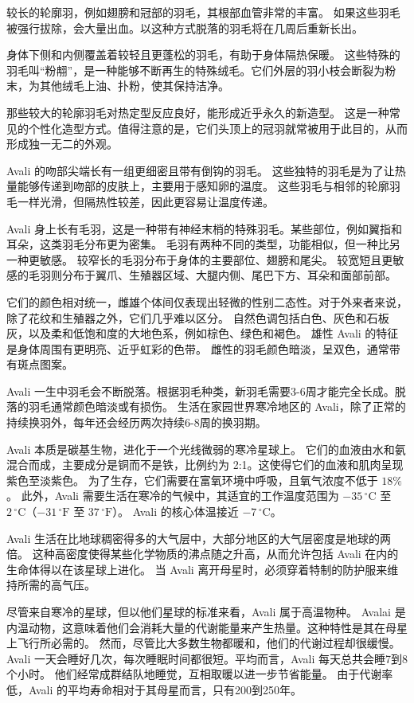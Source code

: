 较长的轮廓羽，例如翅膀和冠部的羽毛，其根部血管非常的丰富。
如果这些羽毛被强行拔除，会大量出血。以这种方式脱落的羽毛将在几周后重新长出。

身体下侧和内侧覆盖着较轻且更蓬松的羽毛，有助于身体隔热保暖。
这些特殊的羽毛叫“粉䎃”，是一种能够不断再生的特殊绒毛。它们外层的羽小枝会断裂为粉末，为其他绒毛上油、扑粉，使其保持洁净。

那些较大的轮廓羽毛对热定型反应良好，能形成近乎永久的新造型。
这是一种常见的个性化造型方式。值得注意的是，它们头顶上的冠羽就常被用于此目的，从而形成独一无二的外观。

Avali 的吻部尖端长有一组更细密且带有倒钩的羽毛。
这些独特的羽毛是为了让热量能够传递到吻部的皮肤上，主要用于感知卵的温度。
这些羽毛与相邻的轮廓羽毛一样光滑，但隔热性较差，因此更容易让温度传递。

Avali 身上长有毛羽，这是一种带有神经末梢的特殊羽毛。某些部位，例如翼指和耳朵，这类羽毛分布更为密集。
毛羽有两种不同的类型，功能相似，但一种比另一种更敏感。
较窄长的毛羽分布于身体的主要部位、翅膀和尾尖。
较宽短且更敏感的毛羽则分布于翼爪、生殖器区域、大腿内侧、尾巴下方、耳朵和面部前部。

它们的颜色相对统一，雌雄个体间仅表现出轻微的性别二态性。对于外来者来说，除了花纹和生殖器之外，它们几乎难以区分。
自然色调包括白色、灰色和石板灰，以及柔和低饱和度的大地色系，例如棕色、绿色和褐色。
雄性 Avali 的特征是身体周围有更明亮、近乎虹彩的色带。
雌性的羽毛颜色暗淡，呈双色，通常带有斑点图案。

Avali 一生中羽毛会不断脱落。根据羽毛种类，新羽毛需要3-6周才能完全长成。脱落的羽毛通常颜色暗淡或有损伤。
生活在家园世界寒冷地区的 Avali，除了正常的持续换羽外，每年还会经历两次持续6-8周的换羽期。


Avali 本质是碳基生物，进化于一个光线微弱的寒冷星球上。
它们的血液由水和氨混合而成，主要成分是铜而不是铁，比例约为 2:1。这使得它们的血液和肌肉呈现紫色至淡紫色。
为了生存，它们需要在富氧环境中呼吸，且氧气浓度不低于 $18\%$。
此外，Avali 需要生活在寒冷的气候中，其适宜的工作温度范围为 $-35\,^\circ\mathrm{C}$ 至 $2\,^\circ\mathrm{C}$（$-31\,^\circ\mathrm{F}$ 至 $37\,^\circ\mathrm{F}$）。
Avali 的核心体温接近 $-7\,^\circ\mathrm{C}$。

Avali 生活在比地球稠密得多的大气层中，大部分地区的大气层密度是地球的两倍。
这种高密度使得某些化学物质的沸点随之升高，从而允许包括 Avali 在内的生命体得以在该星球上进化。
当 Avali 离开母星时，必须穿着特制的防护服来维持所需的高气压。

尽管来自寒冷的星球，但以他们星球的标准来看，Avali 属于高温物种。
Avalai 是内温动物，这意味着他们会消耗大量的代谢能量来产生热量。这种特性是其在母星上飞行所必需的。
然而，尽管比大多数生物都暖和，他们的代谢过程却很缓慢。
Avali 一天会睡好几次，每次睡眠时间都很短。平均而言，Avali 每天总共会睡7到8个小时。
他们经常成群结队地睡觉，互相取暖以进一步节省能量。
由于代谢率低，Avali 的平均寿命相对于其母星而言，只有200到250年。

